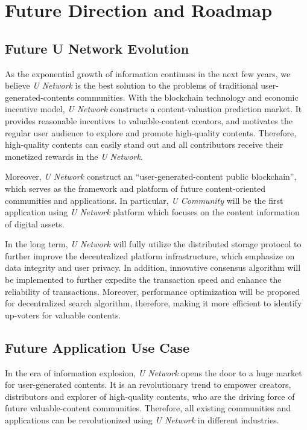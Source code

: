 \chapter{Future Direction and Roadmap}

\section{Future U Network Evolution}
As the exponential growth of information continues in the next few years, we believe \emph{U Network} is the best solution to the problems of traditional user-generated-contents communities. With the blockchain technology and economic incentive model, \emph{U Network} constructs a content-valuation prediction market. It provides reasonable incentives to valuable-content creators, and motivates the regular user audience to explore and promote high-quality contents. Therefore, high-quality contents can easily stand out and all contributors receive their monetized rewards in the \emph{U Network}.

Moreover,  \emph{U Network} construct an ``user-generated-content public blockchain'', which serves as the framework and platform of future content-oriented communities and applications. In particular,  \emph{U Community} will be the first application using  \emph{U Network} platform which focuses on the content information of digital assets.

In the long term,  \emph{U Network}  will fully utilize the distributed storage protocol to further improve the decentralized platform infrastructure, which emphasize on data integrity and user privacy.  In addition, innovative consensus algorithm will be implemented to further expedite the transaction speed and enhance the reliability of transactions. Moreover, performance optimization will be proposed for decentralized search algorithm, therefore, making it more efficient to identify up-voters for valuable contents. 

\section{Future Application Use Case}
In the era of information explosion, \emph{U Network} opens the door to a huge market for user-generated contents. It is an revolutionary trend to empower creators, distributors and explorer of high-quality contents, who are the driving force of future valuable-content communities. Therefore, all existing communities and applications can be revolutionized using \emph{U Network} in different industries. 

